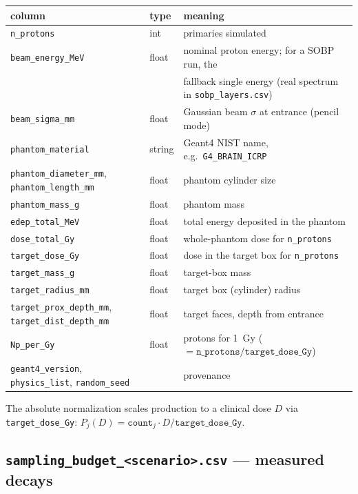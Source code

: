 \documentclass[11pt]{article}
\newcommand{\file}[1]{\texttt{#1}}
\begin{document}
\begin{center}
\begin{tabular}{@{}lll@{}}
\toprule
column & type & meaning \\
\midrule
\file{n\_protons} & int & primaries simulated \\
\file{beam\_energy\_MeV} & float & nominal proton energy; for a SOBP run, the \\
 & & fallback single energy (real spectrum in \file{sobp\_layers.csv}) \\
\file{beam\_sigma\_mm} & float & Gaussian beam $\sigma$ at entrance (pencil mode) \\
\file{phantom\_material} & string & Geant4 NIST name, e.g.\ \file{G4\_BRAIN\_ICRP} \\
\file{phantom\_diameter\_mm}, \file{phantom\_length\_mm} & float & phantom cylinder size \\
\file{phantom\_mass\_g} & float & phantom mass \\
\file{edep\_total\_MeV} & float & total energy deposited in the phantom \\
\file{dose\_total\_Gy} & float & whole-phantom dose for \file{n\_protons} \\
\file{target\_dose\_Gy} & float & dose in the target box for \file{n\_protons} \\
\file{target\_mass\_g} & float & target-box mass \\
\file{target\_radius\_mm} & float & target box (cylinder) radius \\
\file{target\_prox\_depth\_mm}, \file{target\_dist\_depth\_mm} & float & target faces, depth from entrance \\
\file{Np\_per\_Gy} & float & protons for \SI{1}{Gy} ($=\file{n\_protons}/\file{target\_dose\_Gy}$) \\
\file{geant4\_version}, \file{physics\_list}, \file{random\_seed} & & provenance \\
\bottomrule
\end{tabular}
\end{center}

The absolute normalization scales production to a clinical dose $D$ via
\file{target\_dose\_Gy}: $P_j(D)=\file{count}_j\cdot D/\file{target\_dose\_Gy}$.

\subsection{\file{sampling\_budget\_<scenario>.csv} --- measured decays}
\end{document}
